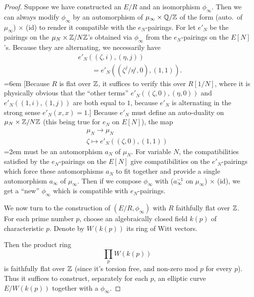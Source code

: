 \begin{proof}
Suppose we have constructed an $E/R$ and an isomorphism $\phi_{\infty}$. Then we can always modify $\phi_{\infty}$ by an automorphism of $\mu_{\infty} \times \mathbb{Q}/\mathbb{Z}$ of the form (auto.\ of $\mu_{\infty}$) $\times$ (id) to render it compatible with the $e_N$-pairings. For let $e'_N$ be the pairings on the $\mu_N \times \mathbb{Z}/N\mathbb{Z}$'s obtained via $\phi_{\infty}$ from the $e_N$-pairings on the $E[N]$'s. Because they are alternating, we necessarily have
\[
\begin{aligned}
& e'_N((\zeta, i), (\eta, j)) \\
& \qquad = e'_N((\zeta^j/\eta^i, 0), (1,1)) .
\end{aligned}
\]
\emergencystretch=6em
[Because $R$ is flat over $\mathbb{Z}$, it suffices to verify this over $R[1/N]$, where it is physically obvious that the ``other terms'' $e'_N((\zeta,0), (\eta,0))$ and $e'_N((1,i), (1,j))$ are both equal to $1$, because $e'_N$ is alternating in the strong sense $e'_N(x,x) = 1$.] Because $e'_N$ must define an auto-duality on $\mu_N \times \mathbb{Z}/N\mathbb{Z}$ (this being true for $e_N$ on $E[N]$), the map
\[
\begin{gathered}
\mu_N \longrightarrow \mu_N \\
\zeta \longmapsto e'_N((\zeta,0), (1,1))
\end{gathered}
\]
\emergencystretch=2em
must be an automorphism $a_N$ of $\mu_N$. For variable $N$, the compatibilities satisfied by the $e_N$-pairings on the $E[N]$ give compatibilities on the $e'_N$-pairings which force these automorphisms $a_N$ to fit together and provide a single automorphism $a_{\infty}$ of $\mu_{\infty}$. Then if we compose $\phi_{\infty}$ with ($a_{\infty}^{-1}$ on $\mu_{\infty}$) $\times$ (id), we get a ``new'' $\phi_{\infty}$ which is compatible with $e_N$-pairings.

We now turn to the construction of $(E/R, \phi_{\infty})$ with $R$ faithfully flat over $\mathbb{Z}$. For each prime number $p$, choose an algebraically closed field $k(p)$ of characteristic $p$. Denote by $W(k(p))$ its ring of Witt vectors.

Then the product ring
\[
\prod_p W(k(p))
\]
is faithfully flat over $\mathbb{Z}$ (since it's torsion free, and non-zero mod $p$ for every $p$). Thus it suffices to construct, separately for each $p$, an elliptic curve $E/W(k(p))$ together with a $\phi_{\infty}$.


\end{proof}
